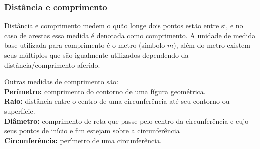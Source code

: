 \begin{multicols*}{2}
    \subsubsection*{Distância e comprimento}
    Distância e comprimento medem o quão longe dois pontos estão entre si, e no caso de arestas essa medida é
    denotada como comprimento. A unidade de medida base utilizada para comprimento é o metro (símbolo ${m}$), além do
    metro existem seus múltiplos que são igualmente utilizados dependendo da distância/comprimento aferido.
    \begin{table}[H]
    \end{table}
    Outras medidas de comprimento são: \\
    \textbf{Perímetro:} comprimento do contorno de uma fígura geométrica. \\
    \textbf{Raio:} distância entre o centro de uma circunferência até seu contorno ou superfície.\\
    \textbf{Diâmetro:} comprimento de reta que passe pelo centro da circunferência e cujo seus pontos de
    início e fim estejam sobre a circunferência\\
    \textbf{Circunferência:} perímetro de uma circunferência.\\


\end{multicols*}

